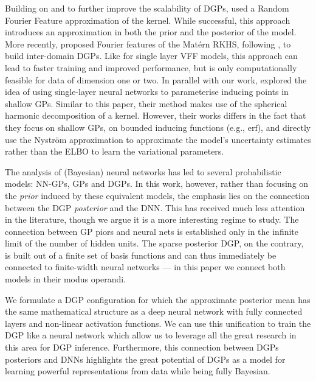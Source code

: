 Building on \citet{salimbeni2017doubly} and to further improve the scalability of DGPs, \citet{cutajar2017random} used a Random Fourier Feature \citep[RFF]{rahimi2008random} approximation of the kernel. While successful, this approach introduces an approximation in both the prior and the posterior of the model. More recently, \citet{rudner2020inter} proposed Fourier features of the Mat\'ern RKHS, following \citet[Variational Fourier Features (VFF)]{hensman2017variational}, to build inter-domain DGPs. Like for single layer VFF models, this approach can lead to faster training and improved performance, but is only computationally feasible for data of dimension one or two. In parallel with our work, \citet{sun2021neural} explored the idea of using single-layer neural networks to parameterise inducing points in shallow GPs. Similar to this paper, their method makes use of the spherical harmonic decomposition of a kernel. However, their works differs in the fact that they focus on shallow GPs, on bounded inducing functions (e.g.,  $\textrm{erf}$), and directly use the Nystr\"om approximation to approximate the model's uncertainty estimates rather than the ELBO to learn the variational parameters.

The analysis of (Bayesian) neural networks has led to several probabilistic models: NN-GPs, GPs and DGPs. In this work, however, rather than focusing on the \emph{prior} induced by these equivalent models, the emphasis lies on the connection between the DGP \emph{posterior} and the DNN. This has received much less attention in the literature, though we argue it is a more interesting regime to study. The connection between GP piors and neural nets is established only in the infinite limit of the number of hidden units. The sparse posterior DGP, on the contrary, is built out of a finite set of basis functions and can thus immediately be connected to finite-width neural networks --- in this paper we connect both models in their modus operandi.

We formulate a DGP configuration for which the approximate posterior mean has the same mathematical structure as a deep neural network with fully connected layers and non-linear activation functions. We can use this unification to train the DGP like a neural network which allow us to leverage all the great research in this area for DGP inference. Furthermore, this connection between DGPs posteriors and DNNs highlights the great potential of DGPs as a model for learning powerful representations from data while being fully Bayesian.

